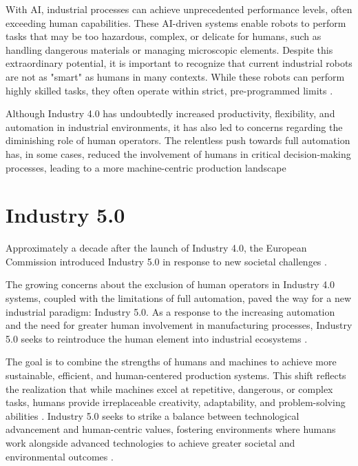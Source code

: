 With \ac{AI}, industrial processes can achieve unprecedented performance levels, often exceeding human capabilities. These \ac{AI}-driven systems 
enable robots to perform tasks that may be too hazardous, complex, or delicate for humans, such as handling dangerous materials or managing 
microscopic elements. 
Despite this extraordinary potential, it is important to recognize that current industrial robots are not as "smart" as humans in many contexts. 
While these robots can perform highly skilled tasks, they often operate within strict, pre-programmed limits \cite{Ahmed2022}.

Although Industry 4.0 has undoubtedly increased productivity, flexibility, and automation in industrial environments, it has also led to concerns 
regarding the diminishing role of human operators. The relentless push towards full automation has, in some cases, reduced the involvement of 
humans in critical decision-making processes, leading to a more machine-centric production landscape \cite{GOLOVIANKO2023102}

\section{Industry 5.0}

Approximately a decade after the launch of Industry 4.0, the European Commission introduced Industry 5.0 in response to new societal challenges 
\cite{industry5}.

The growing concerns about the exclusion of human operators in Industry 4.0 systems, coupled with the limitations of full automation, paved the way 
for a new industrial paradigm: Industry 5.0. As a response to the increasing automation and the need for greater human involvement in manufacturing 
processes, Industry 5.0 seeks to reintroduce the human element into industrial ecosystems \cite{su11164371}.

The goal is to combine the strengths of humans and machines to achieve more sustainable, efficient, and human-centered production systems.
This shift reflects the realization that while machines excel at repetitive, dangerous, or complex tasks, humans provide irreplaceable creativity, 
adaptability, and problem-solving abilities \cite{10577684}.
Industry 5.0 seeks to strike a balance between technological advancement and human-centric values, fostering environments where humans work alongside 
advanced technologies to achieve greater societal and environmental outcomes \cite{GOLOVIANKO2023102}.

